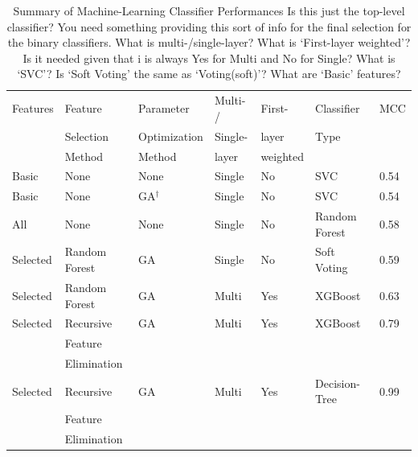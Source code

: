\documentclass[12pt]{article}
\newcommand{\lilian}[1]{ {\color{red}{\bfseries Lilian:} #1}}
\begin{document}
\begin{table}
  \centering
  \caption{Summary of Machine-Learning Classifier Performances \lilian{Is this just the top-level classifier? You need something providing this sort of info for the final selection for the binary classifiers. What is multi-/single-layer? What is `First-layer weighted'? Is it needed given that i is always Yes for Multi and No for Single? What is `SVC'? Is `Soft Voting' the same as `Voting(soft)'? What are `Basic' features?}}
  \label{tab:results_tableX}

  \small
  \begin{tabular}{lllllll}\hline
    Features        & Feature       & Parameter         & Multi- / & First-    & Classifier    & MCC  \\
                    & Selection     & Optimization      & Single-  & layer     & Type          &      \\
                    & Method        & Method            & layer    & weighted  &               &      \\ \hline
    Basic           & None          & None              & Single   & No        & SVC           & 0.54 \\
    Basic           & None          & GA$^\dag$         & Single   & No        & SVC           & 0.54 \\
    All             & None          & None              & Single   & No        & Random Forest & 0.58 \\
    Selected        & Random Forest & GA                & Single   & No        & Soft Voting   & 0.59 \\
    Selected        & Random Forest & GA                & Multi    & Yes       & XGBoost       & 0.63 \\
    Selected        & Recursive     & GA                & Multi    & Yes       & XGBoost       & 0.79 \\
                    & Feature       &                   &          &           &               &      \\
                    & Elimination   &                   &          &           &               &      \\
    Selected        & Recursive     & GA                & Multi    & Yes       & Decision-Tree & 0.99 \\
                    & Feature       &                   &          &           &               &      \\
                    & Elimination   &                   &          &           &               &      \\

\end{tabular}
\end{table}
\end{document}
